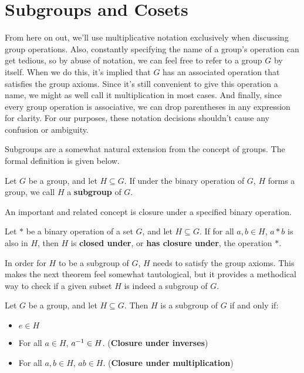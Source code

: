 \section{Subgroups and Cosets}

From here on out, we'll use multiplicative notation exclusively when discussing group operations. Also, constantly specifying the name of a group's operation can get tedious, so by abuse of notation, we can feel free to refer to a group $G$ by itself. When we do this, it's implied that $G$ has an associated operation that satisfies the group axioms. Since it's still convenient to give this operation a name, we might as well call it multiplication in most cases. And finally, since every group operation is associative, we can drop parentheses in any expression for clarity. For our purposes, these notation decisions shouldn't cause any confusion or ambiguity.

Subgroups are a somewhat natural extension from the concept of groups. The formal definition is given below.

\begin{definition}
Let $G$ be a group, and let $H \subseteq G$. If under the binary operation of $G$, $H$ forms a group, we call $H$ a \textbf{subgroup} of $G$.
\end{definition}

An important and related concept is closure under a specified binary operation.

\begin{definition}
Let $*$ be a binary operation of a set $G$, and let $H \subseteq G$. If for all $a, b \in H$, $a*b$ is also in $H$, then $H$ is \textbf{closed under}, or \textbf{has closure under}, the operation $*$.
\end{definition}

In order for $H$ to be a subgroup of $G$, $H$ needs to satisfy the group axioms. This makes the next theorem feel somewhat tautological, but it provides a methodical way to check if a given subset $H$ is indeed a subgroup of $G$.

\begin{theorem}
\label{subgroup}
Let $G$ be a group, and let $H \subseteq G$. Then $H$ is a subgroup of $G$ if and only if:
\begin{itemize}
    \item $e \in H$
    \item For all $a \in H$, $a^{-1} \in H$. (\textbf{Closure under inverses})
    \item For all $a, b \in H$, $ab \in H$. (\textbf{Closure under multiplication})
\end{itemize}
\end{theorem}


